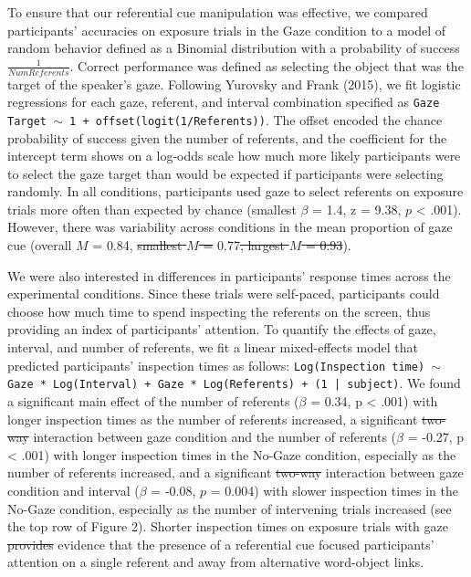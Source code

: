 \documentclass[authoryear, review]{elsarticle}
\providecommand{\DIFaddtex}[1]{{\protect\color{blue}\uwave{#1}}} %
\providecommand{\DIFdeltex}[1]{{\protect\color{red}\sout{#1}}}                      %
\providecommand{\DIFaddbegin}{} %
\providecommand{\DIFaddend}{} %
\providecommand{\DIFdelbegin}{} %
\providecommand{\DIFdelend}{} %
\providecommand{\DIFadd}[1]{\texorpdfstring{\DIFaddtex{#1}}{#1}} %
\providecommand{\DIFdel}[1]{\texorpdfstring{\DIFdeltex{#1}}{}} %
\begin{document}
To ensure that our referential cue manipulation was effective, we
compared participants' accuracies on exposure trials in the Gaze
condition to a model of random behavior defined as a Binomial
distribution with a probability of success \(\frac{1}{Num Referents}\).
Correct performance was defined as selecting the object that was the
target of the speaker's gaze. Following Yurovsky and Frank (2015), we
fit logistic regressions for each gaze, referent, and interval
combination specified as
\texttt{Gaze Target $\sim$ 1 + offset(logit(1/Referents))}. The offset
encoded the chance probability of success given the number of referents,
and the coefficient for the intercept term shows on a log-odds scale how
much more likely participants were to select the gaze target than would
be expected if participants were selecting randomly. In all conditions,
participants used gaze to select referents on exposure trials more often
than expected by chance (smallest \(\beta\) = 1.4, z = 9.38, \(p\)
\textless{} .001). However, there was variability across conditions in
the mean proportion of gaze cue (overall \(M\) = 0.84, \DIFdelbegin \DIFdel{smallest \(M\) =
}\DIFdelend \DIFaddbegin \DIFadd{range:
}\DIFaddend 0.77\DIFdelbegin \DIFdel{, largest \(M\) = 0.93}\DIFdelend \DIFaddbegin \DIFadd{--0.93}\DIFaddend ).

We were also interested in differences in participants' response times
across the experimental conditions. Since these trials were self-paced,
participants could choose how much time to spend inspecting the
referents on the screen, thus providing an index of participants'
attention. To quantify the effects of gaze, interval, and number of
referents, we fit a linear mixed-effects model that predicted
participants' inspection times as follows:
\texttt{Log(Inspection time) $\sim$ Gaze * Log(Interval) + Gaze * Log(Referents) + (1 | subject)}.
We found a significant main effect of the number of referents (\(\beta\)
= 0.34, p \textless{} .001) with longer inspection times as the number
of referents increased, a significant \DIFdelbegin \DIFdel{two-way }\DIFdelend interaction between gaze condition
and the number of referents (\(\beta\) = -0.27, p \textless{} .001) with
longer inspection times in the No-Gaze condition, especially as the
number of referents increased, and a significant \DIFdelbegin \DIFdel{two-way
}\DIFdelend interaction between
gaze condition and interval (\(\beta\) = -0.08, \(p\) = 0.004) with
slower inspection times in the No-Gaze condition, especially as the
number of intervening trials increased (see the top row of Figure 2).
Shorter inspection times on exposure trials with gaze \DIFdelbegin \DIFdel{provides }\DIFdelend \DIFaddbegin \DIFadd{provide }\DIFaddend evidence
that the presence of a referential cue focused participants' attention
on a single referent and away from alternative word-object links.
\end{document}
